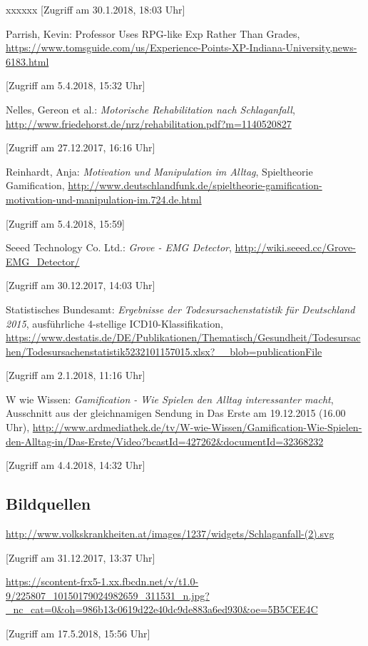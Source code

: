 \begin{thebibliography}{xxxxxx}
[Zugriff am 30.1.2018, 18:03 Uhr]

 Parrish, Kevin: Professor Uses RPG-like Exp Rather Than Grades, \url{https://www.tomsguide.com/us/Experience-Points-XP-Indiana-University,news-6183.html}

[Zugriff am 5.4.2018, 15:32 Uhr]

 Nelles, Gereon et al.: \textit{Motorische Rehabilitation nach Schlaganfall}, \url{http://www.friedehorst.de/nrz/rehabilitation.pdf?m=1140520827}

[Zugriff am 27.12.2017, 16:16 Uhr]

 Reinhardt, Anja: \textit{Motivation und Manipulation im Alltag}, Spieltheorie \glqq Gamification\grqq , \url{http://www.deutschlandfunk.de/spieltheorie-gamification-motivation-und-manipulation-im.724.de.html}

[Zugriff am 5.4.2018, 15:59]

 Seeed Technology Co. Ltd.: \textit{Grove - EMG Detector}, \url{http://wiki.seeed.cc/Grove-EMG_Detector/}

[Zugriff am 30.12.2017, 14:03 Uhr]

 Statistisches Bundesamt: \textit{Ergebnisse der Todesursachenstatistik für Deutschland 2015}, ausführliche 4-stellige ICD10-Klassifikation, \\ \url{https://www.destatis.de/DE/Publikationen/Thematisch/Gesundheit/Todesursachen/Todesursachenstatistik5232101157015.xlsx?__blob=publicationFile}

[Zugriff am 2.1.2018, 11:16 Uhr]

 W wie Wissen: \textit{Gamification - Wie Spielen den Alltag interessanter macht}, Ausschnitt aus der gleichnamigen Sendung in Das Erste am 19.12.2015 (16.00 Uhr), \url{http://www.ardmediathek.de/tv/W-wie-Wissen/Gamification-Wie-Spielen-den-Alltag-in/Das-Erste/Video?bcastId=427262&documentId=32368232}

[Zugriff am 4.4.2018, 14:32 Uhr]

\subsection*{Bildquellen}

 \url{http://www.volkskrankheiten.at/images/1237/widgets/Schlaganfall-(2).svg}

[Zugriff am 31.12.2017, 13:37 Uhr]

 \url{https://scontent-frx5-1.xx.fbcdn.net/v/t1.0-9/225807_10150179024982659_311531_n.jpg?_nc_cat=0&oh=986b13c0619d22e40dc9de883a6ed930&oe=5B5CEE4C}

[Zugriff am 17.5.2018, 15:56 Uhr]
\end{thebibliography}
